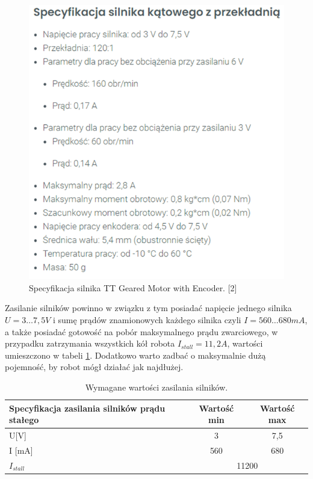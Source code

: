 \documentclass{report}
\begin{document}
\begin{figure}[H]
    \centering
    \includegraphics{src/tech_specifications/TT Geared Motor with Encoder.png}
    \caption{Specyfikacja silnika TT Geared Motor with Encoder. [2]}
    \label{fig:motor-spec}
\end{figure}

Zasilanie silników powinno w związku z tym posiadać napięcie jednego silnika $U=3\ldots7,5 V$ i sumę prądów znamionowych każdego silnika czyli $I=560\ldots680 mA$, a także posiadać gotowość na pobór maksymalnego prądu zwarciowego, w przypadku zatrzymania wszystkich kół robota $I_{stall}=11,2 A$, wartości umieszczono w tabeli \ref{tab:motors-power}. Dodatkowo warto zadbać o maksymalnie dużą pojemność, by robot mógł działać jak najdłużej.


    \begin{table}[H]
    \centering
        \begin{tabular}{|m{10em}|cc|}
        \hline
        Specyfikacja zasilania silników prądu stałego & \multicolumn{1}{c|}{Wartość min} & Wartość max \\ \hline
        U{[}V{]}                                      & \multicolumn{1}{c|}{3}           & 7,5         \\ \hline
        I {[}mA{]}                                    & \multicolumn{1}{c|}{560}         & 680         \\ \hline
        $I_{stall}$                                   & \multicolumn{2}{c|}{11200}                     \\ \hline
        \end{tabular}
        \caption{Wymagane wartości zasilania silników.}
        \label{tab:motors-power}
    \end{table}
\end{document}
